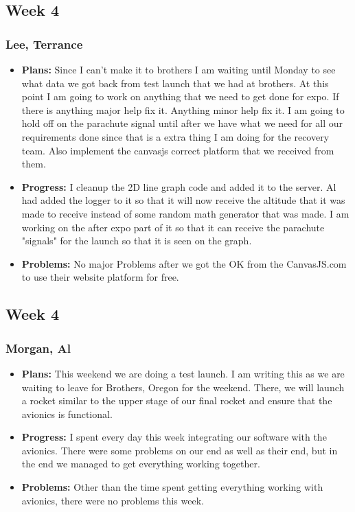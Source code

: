 \documentclass[10pt,draftclsnofoot,onecolumn]{IEEEtran}
\begin{document}
\subsection{Week 4}
\subsubsection{Lee, Terrance}
\begin{itemize}
	\item \textbf{Plans: }
	Since I can't make it to brothers I am waiting until Monday to see what data we got back from test launch that we had at brothers. At this point I am going to work on anything that we need to get done for expo. If there is anything major help fix it. Anything minor help fix it. I am going to hold off on the parachute signal until after we have what we need for all our requirements done since that is a extra thing I am doing for the recovery team. Also implement the canvasjs correct platform that we received from them.
	\item \textbf{Progress:  }
	I cleanup the 2D line graph code and added it to the server. Al had added the logger to it so that it will now receive the altitude that it was made to receive instead of some random math generator that was made. I am working on the after expo part of it so that it can receive the parachute "signals" for the launch so that it is seen on the graph.
	\item \textbf{Problems: }
	No major Problems after we got the OK from the CanvasJS.com to use their website platform for free.
\end{itemize}


\subsection{Week 4}
\subsubsection{Morgan, Al}
\begin{itemize}
	\item \textbf{Plans: }
	This weekend we are doing a test launch. I am writing this as we are waiting to leave for Brothers, Oregon for the weekend. There, we will launch a rocket similar to the upper stage of our final rocket and ensure that the avionics is functional.
	\item \textbf{Progress: }
	I spent every day this week integrating our software with the avionics. There were some problems on our end as well as their end, but in the end we managed to get everything working together.
	\item \textbf{Problems: }
	Other than the time spent getting everything working with avionics, there were no problems this week.
\end{itemize}
\end{document}
